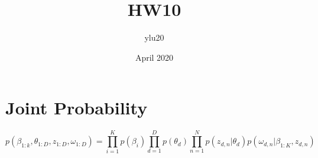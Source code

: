 \documentclass{article}
\title{HW10}
\author{ylu20 }
\date{April 2020}
\begin{document}
\maketitle

\section{Joint Probability}
\begin{equation}
    p(\beta_{1:k},\theta_{1:D},z_{1:D},\omega_{1:D}) = \prod_{i=1}^{K} p(\beta_i)\prod_{d=1}^{D} p(\theta_d)\prod_{n=1}^{N} p(z_{d,n}|\theta_{d})p(\omega_{d,n}|\beta_{1:K},z_{d,n})
\end{equation}
\end{document}
